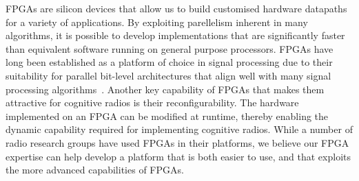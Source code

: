 FPGAs are silicon devices that allow us to build customised hardware datapaths for a variety of applications.
By exploiting parellelism inherent in many algorithms, it is possible to develop implementations that are significantly faster than equivalent software running on general purpose processors.
FPGAs have long been established as a platform of choice in signal processing due to their suitability for parallel bit-level architectures that align well with many signal processing algorithms~\cite{cummings1999}.
Another key capability of FPGAs that makes them attractive for cognitive radios is their reconfigurability.
The hardware implemented on an FPGA can be modified at runtime, thereby enabling the dynamic capability required for implementing cognitive radios.
While a number of radio research groups have used FPGAs in their platforms, we believe our FPGA expertise can help develop a platform that is both easier to use, and that exploits the more advanced capabilities of FPGAs.




